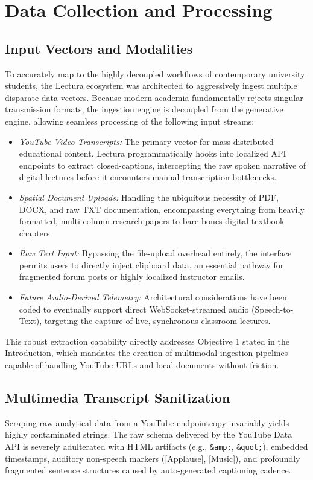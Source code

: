 \chapter{Data Collection and Processing}
\label{chap:data_processing}
\setlength{\parskip}{1em}

\section{Input Vectors and Modalities}
To accurately map to the highly decoupled workflows of contemporary university students, the Lectura ecosystem was architected to aggressively ingest multiple disparate data vectors. Because modern academia fundamentally rejects singular transmission formats, the ingestion engine is decoupled from the generative engine, allowing seamless processing of the following input streams:

\begin{itemize}[label=\textendash]
    \item \textit{YouTube Video Transcripts:} The primary vector for mass-distributed educational content. Lectura programmatically hooks into localized API endpoints to extract closed-captions, intercepting the raw spoken narrative of digital lectures before it encounters manual transcription bottlenecks.
    \item \textit{Spatial Document Uploads:} Handling the ubiquitous necessity of PDF, DOCX, and raw TXT documentation, encompassing everything from heavily formatted, multi-column research papers to bare-bones digital textbook chapters.
    \item \textit{Raw Text Input:} Bypassing the file-upload overhead entirely, the interface permits users to directly inject clipboard data, an essential pathway for fragmented forum posts or highly localized instructor emails.
    \item \textit{Future Audio-Derived Telemetry:} Architectural considerations have been coded to eventually support direct WebSocket-streamed audio (Speech-to-Text), targeting the capture of live, synchronous classroom lectures.
\end{itemize}

This robust extraction capability directly addresses Objective 1 stated in the Introduction, which mandates the creation of multimodal ingestion pipelines capable of handling YouTube URLs and local documents without friction.

\section{Multimedia Transcript Sanitization}
Scraping raw analytical data from a YouTube endpointcopy invariably yields highly contaminated strings. The raw schema delivered by the YouTube Data API is severely adulterated with HTML artifacts (e.g., \verb|&amp;|, \verb|&quot;|), embedded timestamps, auditory non-speech markers ([Applause], [Music]), and profoundly fragmented sentence structures caused by auto-generated captioning cadence.

